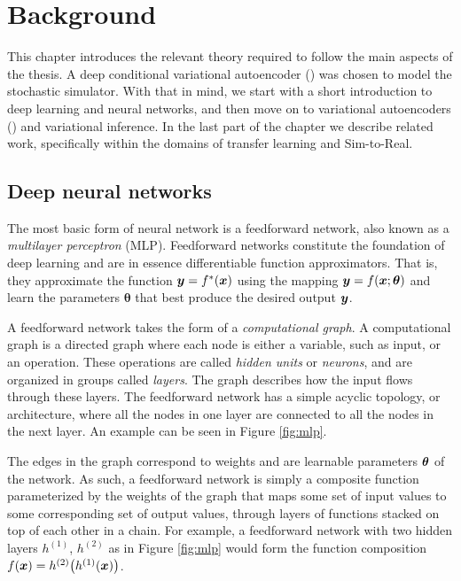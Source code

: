 
\chapter{Background}
\label{background}
This chapter introduces the relevant theory required to follow the main aspects of the thesis. A deep conditional variational autoencoder (\cvae{}) was chosen to model the stochastic simulator. With that in mind, we start with a short introduction to deep learning and neural networks, and then move on to variational autoencoders (\vae{}) and variational inference. In the last part of the chapter we describe related work, specifically within the domains of transfer learning and Sim-to-Real.


\section{Deep neural networks}

The most basic form of neural network is a feedforward network, also known as a \emph{multilayer perceptron} (MLP). Feedforward networks constitute the foundation of deep learning and are in essence differentiable function approximators. That is, they approximate the function $\boldsymbol{y}=f^{*}(\boldsymbol{x})$ using the mapping $\boldsymbol{y} = f(\boldsymbol{x}; \boldsymbol{\theta})$ and learn the parameters $\pmb{\theta}$ that best produce the desired output $\boldsymbol{y}$.

A feedforward network takes the form of a \textit{computational graph}. A computational graph is a directed graph where each node is either a variable, such as input, or an operation. These operations are called \emph{hidden units} or \emph{neurons}, and are organized in groups called \emph{layers}. The graph describes how the input flows through these layers.
The feedforward network has a simple acyclic topology, or architecture, where all the nodes in one layer are connected to all the nodes in the next layer. An example can be seen in Figure \ref{fig:mlp}.

The edges in the graph correspond to weights and are learnable parameters $\boldsymbol{\theta}$ of the network. As such, a feedforward network is simply a composite function parameterized by the weights of the graph that maps some set of input values to some corresponding set of output values, through layers of functions stacked on top of each other in a chain. For example, a feedforward network with two hidden layers $h^{(1)}$, $h^{(2)}$ as in Figure \ref{fig:mlp} would form the function composition $f(\boldsymbol{x}) = h^{(2)}\big(h^{(1)}(\boldsymbol{x})\big)$.


